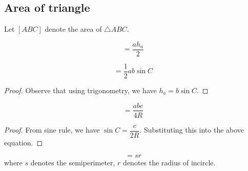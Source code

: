 \begin{figure}[H]
    \centering
\end{figure}
\pagebreak

\subsection{Area of triangle}
Let $[ABC]$ denote the area of $\triangle ABC$.

\begin{proposition}
\begin{equation}
[ABC]=\frac{ah_a}{2}
\end{equation}
\end{proposition}

\begin{proposition}
\begin{equation}
[ABC]=\frac{1}{2}ab\sin C
\end{equation}
\end{proposition}

\begin{proof}
Observe that using trigonometry, we have $h_a=b\sin C$.
\end{proof}

\begin{proposition}
\begin{equation}
[ABC] = \frac{abc}{4R} 
\end{equation}
\end{proposition}

\begin{proof}
From sine rule, we have $\sin C=\dfrac{c}{2R}$. Substituting this into the above equation.
\end{proof}

\begin{proposition}
\begin{equation}
[ABC] = sr
\end{equation}
where $s$ denotes the semiperimeter, $r$ denotes the radius of incircle.
\end{proposition}

